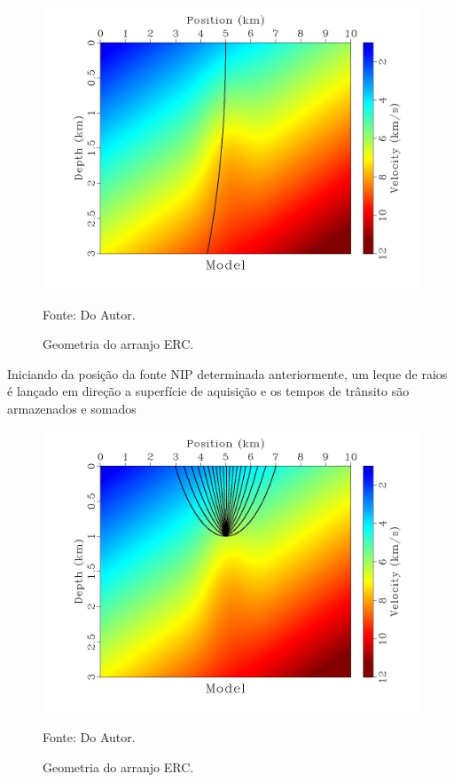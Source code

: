 \begin{figure}[H]
\caption{Geometria do arranjo ERC.}
\begin{center}
\includegraphics[scale=0.3]{images/raiomodelo.jpg}
\vspace{-0.3cm}
\end{center}
\begin{center}
 Fonte: Do Autor.
\end{center}
\label{fig:2.2}
\end{figure}

Iniciando da posição da fonte NIP determinada anteriormente, um leque de raios é lançado em direção 
a superfície de aquisição e os tempos de trânsito são armazenados e somados \cite{stereo}

\begin{figure}[H]
\caption{Geometria do arranjo ERC.}
\begin{center}
\includegraphics[scale=0.3]{images/raioleque.jpg}
\vspace{-0.3cm}
\end{center}
\begin{center}
 Fonte: Do Autor.
\end{center}
\label{fig:2.3}
\end{figure}



